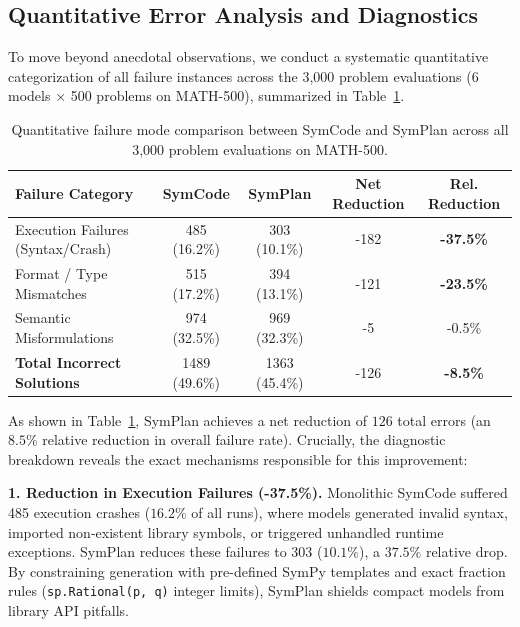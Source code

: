 \documentclass[runningheads]{llncs}
\begin{document}
\subsection{Quantitative Error Analysis and Diagnostics}
\label{sec:error_analysis}

To move beyond anecdotal observations, we conduct a systematic quantitative categorization of all failure instances across the 3,000 problem evaluations (6 models $\times$ 500 problems on MATH-500), summarized in Table~\ref{tab:error_breakdown}.

\begin{table}[t]
\centering
\caption{Quantitative failure mode comparison between SymCode and SymPlan across all 3,000 problem evaluations on MATH-500.}
\label{tab:error_breakdown}
\setlength{\tabcolsep}{5pt}
\small
\begin{tabular}{lcccc}
\toprule
\rowcolor{headergray}
\textbf{Failure Category} & \textbf{SymCode} & \textbf{SymPlan} & \textbf{Net Reduction} & \textbf{Rel. Reduction} \\
\midrule
Execution Failures (Syntax/Crash) & 485 (16.2\%) & 303 (10.1\%) & -182 & \textbf{-37.5\%} \\
Format / Type Mismatches & 515 (17.2\%) & 394 (13.1\%) & -121 & \textbf{-23.5\%} \\
Semantic Misformulations & 974 (32.5\%) & 969 (32.3\%) & -5 & -0.5\% \\
\midrule
\rowcolor{ourgreen}
\textbf{Total Incorrect Solutions} & 1489 (49.6\%) & 1363 (45.4\%) & -126 & \textbf{-8.5\%} \\
\bottomrule
\end{tabular}
\end{table}

As shown in Table~\ref{tab:error_breakdown}, SymPlan achieves a net reduction of $126$ total errors (an $8.5\%$ relative reduction in overall failure rate). Crucially, the diagnostic breakdown reveals the exact mechanisms responsible for this improvement:

\textbf{1. Reduction in Execution Failures (-37.5\%).} Monolithic SymCode suffered 485 execution crashes ($16.2\%$ of all runs), where models generated invalid syntax, imported non-existent library symbols, or triggered unhandled runtime exceptions. SymPlan reduces these failures to 303 ($10.1\%$), a $37.5\%$ relative drop. By constraining generation with pre-defined SymPy templates and exact fraction rules (\texttt{sp.Rational(p, q)} integer limits), SymPlan shields compact models from library API pitfalls.
\end{document}
